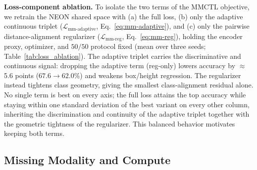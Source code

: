 \documentclass[10pt,twocolumn,letterpaper]{article}
\renewcommand{\red}[1]{#1}
\newcommand{\new}[1]{#1}
\begin{document}
\new{\noindent\textbf{Loss-component ablation.}
To isolate the two terms of the MMCTL objective, we retrain the NEON shared space with (a) the full loss, (b) only the adaptive continuous triplet ($\mathcal{L}_{\text{mm-adaptive}}$, Eq.~\eqref{eq:mm-adaptive}), and (c) only the pairwise distance-alignment regularizer ($\mathcal{L}_{\text{mm-reg}}$, Eq.~\eqref{eq:mm-reg}), holding the encoder proxy, optimizer, and $50/50$ protocol fixed (mean over three seeds; Table~\ref{tab:loss_ablation}). The adaptive triplet carries the discriminative and continuous signal: dropping the adaptive term (reg-only) lowers accuracy by $\approx$5.6 points ($67.6\rightarrow62.0\%$) and weakens box/height regression. The regularizer instead tightens class geometry, giving the smallest class-alignment residual alone. No single term is best on every axis; the full loss attains the top accuracy while staying within one standard deviation of the best variant on every other column, inheriting the discrimination and continuity of the adaptive triplet together with the geometric tightness of the regularizer. This balanced behavior motivates keeping both terms.}

\begin{table}[t]
\centering
\caption{\new{NEON loss-component ablation (torch proxy, $128$-d embeddings, mean over three seeds). \emph{Adaptive} is the continuous triplet with an annotation-derived margin; \emph{reg} is the pairwise distance-alignment term. \textbf{Align-cls} is the class-distance alignment residual (lower is tighter). The adaptive term drives accuracy and continuous regression, the regularizer tightens class geometry, and the full loss combines both. Best per column in bold.}}
\label{tab:loss_ablation}
{
}
\end{table}

\subsection{\red{Missing Modality and Compute}}
\label{subsec:additional-analyses}
\end{document}
